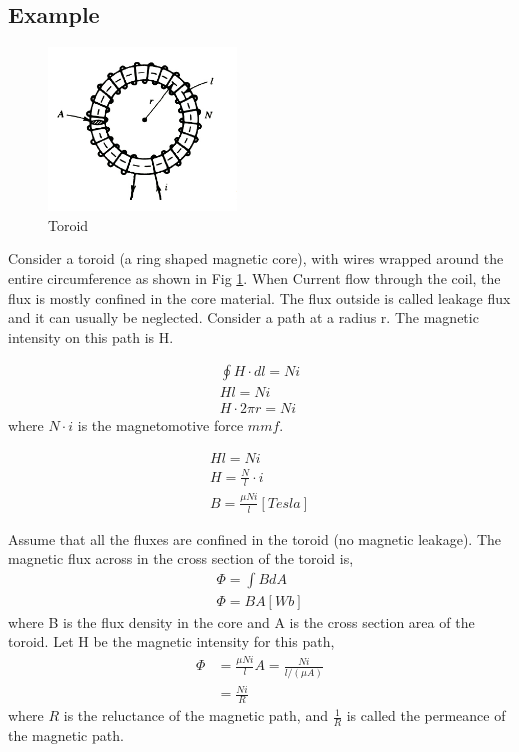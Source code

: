 \documentclass{article}
\begin{document}
    \subsection*{Example}
        \begin{figure}[H]
            \centering
            \includegraphics[width=5cm]{figures/toroid.PNG}
            \caption{Toroid}
            \label{fig:toroid}
        \end{figure}

    Consider a toroid (a ring shaped magnetic core), with wires wrapped around the entire circumference as shown in Fig \ref{fig:toroid}.
    When Current flow through the coil, the flux is mostly confined in the core material. The flux outside is called 
    leakage flux and it can usually be neglected. Consider a path at a radius r. The magnetic intensity on this path is H.
   
    
        \begin{align*}
            \oint H\cdot dl = Ni\\
            Hl = Ni\\
            H \cdot 2 \pi r = Ni
        \end{align*}
        where $N\cdot i$ is the magnetomotive force $mmf$.

        \begin{align*}
            Hl = Ni\\
            H = \frac{N}{l}\cdot i\\
            B = \frac{\mu Ni}{l} [Tesla]
        \end{align*}
    
    Assume that all the fluxes are confined in the toroid (no magnetic leakage). The magnetic flux across in the 
    cross section of the toroid is,
        \begin{align*}
            \Phi = \int{BdA}\\
            \Phi = BA[Wb]
        \end{align*}
    where B is the flux density in the core and A is the cross section area of the toroid.
    Let H be the magnetic intensity for this path,
        \begin{align*}
            \Phi &= \frac{\mu Ni}{l} A = \frac{Ni}{l/(\mu A)}\\
            &= \frac{Ni}{R}
        \end{align*}
    where $R$ is the reluctance of the magnetic path, and $\frac{1}{R}$ is called the permeance of the magnetic path.
\end{document}
